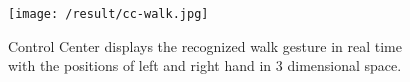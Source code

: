 \begin{figure}
	[h] \centering 
	\texttt{[image: /result/cc-walk.jpg]} \caption{Control Center displays the recognized walk gesture in real time with the positions of left and right hand in 3 dimensional space. } \label{fg:cc:walk} 
\end{figure}
